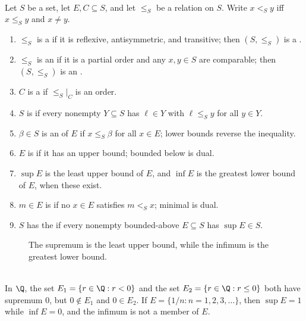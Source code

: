 \begin{definition} \label{def:ordered-set-vocabulary}\label{def:ordered-set-and-bounds}\label{def:supremum-infimum-lub-property} \\
Let $S$ be a set, let $E,C\subseteq S$, and let $\leq_S$ be a relation on $S$. Write $x<_Sy$ iff $x\leq_Sy$ and $x\neq y$.
\begin{enumerate}[label=(\roman*)]
\setlength{\itemsep}{0pt}
\item $\leq_S$ is a  if it is reflexive, antisymmetric, and transitive; then $(S,\leq_S)$ is a .
\item $\leq_S$ is an  if it is a partial order and any $x,y\in S$ are comparable; then $(S,\leq_S)$ is an .
\item $C$ is a  if $\leq_S|_C$ is an order.
\item $S$ is  if every nonempty $Y\subseteq S$ has $\ell\in Y$ with $\ell\leq_Sy$ for all $y\in Y$.
\item $\beta\in S$ is an  of $E$ if $x\leq_S\beta$ for all $x\in E$; lower bounds reverse the inequality.
\item $E$ is  if it has an upper bound; bounded below is dual.
\item $\sup E$ is the least upper bound of $E$, and $\inf E$ is the greatest lower bound of $E$, when these exist.
\item $m\in E$ is  if no $x\in E$ satisfies $m<_Sx$; minimal is dual.
\item $S$ has the  if every nonempty bounded-above $E\subseteq S$ has $\sup E\in S$.
\end{enumerate}
\end{definition}

\begin{figure}[H]
  \centering
  
  \caption{The supremum is the least upper bound, while the infimum is the greatest lower bound.}
  \label{fig:supremum-infimum-bounds}
\end{figure}

\begin{example} \label{ex:supremum-need-not-be-attained} \\
In $\Q$, the set $E_1=\{r\in\Q:r<0\}$ and the set $E_2=\{r\in\Q:r\leq0\}$ both have supremum $0$, but $0\notin E_1$ and $0\in E_2$. If $E=\{1/n:n=1,2,3,\ldots\}$, then $\sup E=1$ while $\inf E=0$, and the infimum is not a member of $E$.
\end{example}

